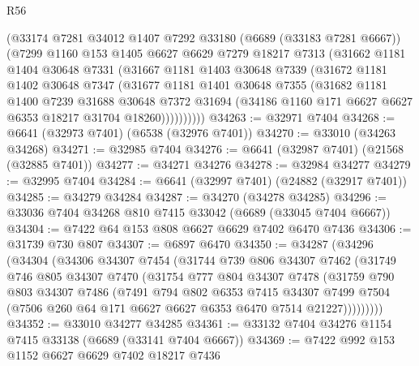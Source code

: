\begin{lexlean}{R56}
\begin{coremodule}
        (@33174
          @7281
          @34012
          @1407
          @7292
          @33180
          (@6689 (@33183 @7281 @6667))
          (@7299
            @1160
            @153
            @1405
            @6627
            @6629
            @7279
            @18217
            @7313
            (@31662
              @1181
              @1404
              @30648
              @7331
              (@31667
                @1181
                @1403
                @30648
                @7339
                (@31672
                  @1181
                  @1402
                  @30648
                  @7347
                  (@31677
                    @1181
                    @1401
                    @30648
                    @7355
                    (@31682
                      @1181
                      @1400
                      @7239
                      @31688
                      @30648
                      @7372
                      @31694
                      (@34186 @1160 @171 @6627 @6627 @6353 @18217 @31704 @18260))))))))))
@34263 := @32971 @7404
@34268 := @6641 (@32973 @7401) (@6538 (@32976 @7401))
@34270 := @33010 (@34263 @34268)
@34271 := @32985 @7404
@34276 := @6641 (@32987 @7401) (@21568 (@32885 @7401))
@34277 := @34271 @34276
@34278 := @32984 @34277
@34279 := @32995 @7404
@34284 := @6641 (@32997 @7401) (@24882 (@32917 @7401))
@34285 := @34279 @34284
@34287 := @34270 (@34278 @34285)
@34296 := @33036 @7404 @34268 @810 @7415 @33042 (@6689 (@33045 @7404 @6667))
@34304 := @7422 @64 @153 @808 @6627 @6629 @7402 @6470 @7436
@34306 := @31739 @730 @807
@34307 := @6897 @6470
@34350 := @34287
    (@34296
      (@34304
        (@34306
          @34307
          @7454
          (@31744
            @739
            @806
            @34307
            @7462
            (@31749
              @746
              @805
              @34307
              @7470
              (@31754
                @777
                @804
                @34307
                @7478
                (@31759
                  @790
                  @803
                  @34307
                  @7486
                  (@7491
                    @794
                    @802
                    @6353
                    @7415
                    @34307
                    @7499
                    @7504
                    (@7506 @260 @64 @171 @6627 @6627 @6353 @6470 @7514 @21227)))))))))
@34352 := @33010 @34277 @34285
@34361 := @33132 @7404 @34276 @1154 @7415 @33138 (@6689 (@33141 @7404 @6667))
@34369 := @7422 @992 @153 @1152 @6627 @6629 @7402 @18217 @7436

\end{coremodule}
\end{lexlean}
